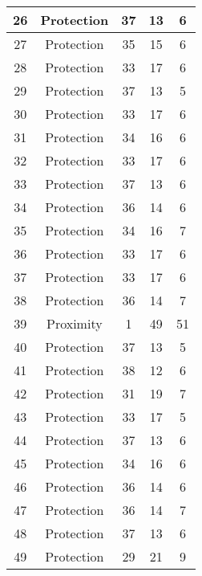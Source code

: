 \documentclass[results.tex]{subfiles}
\begin{document}
\begin{center}
\begin{tabular}{| c || c | c | c | c |}
    \hline
    26 & Protection & 37 & 13 & 6 \\ 
    \hline
    27 & Protection & 35 & 15 & 6 \\ 
    \hline
    28 & Protection & 33 & 17 & 6 \\ 
    \hline
    29 & Protection & 37 & 13 & 5 \\ 
    \hline
    30 & Protection & 33 & 17 & 6 \\ 
    \hline
    31 & Protection & 34 & 16 & 6 \\ 
    \hline
    32 & Protection & 33 & 17 & 6 \\ 
    \hline
    33 & Protection & 37 & 13 & 6 \\ 
    \hline
    34 & Protection & 36 & 14 & 6 \\ 
    \hline
    35 & Protection & 34 & 16 & 7 \\ 
    \hline
    36 & Protection & 33 & 17 & 6 \\ 
    \hline
    37 & Protection & 33 & 17 & 6 \\ 
    \hline
    38 & Protection & 36 & 14 & 7 \\ 
    \hline
    39 & Proximity & 1 & 49 & 51 \\ 
    \hline
    40 & Protection & 37 & 13 & 5 \\ 
    \hline
    41 & Protection & 38 & 12 & 6 \\ 
    \hline
    42 & Protection & 31 & 19 & 7 \\ 
    \hline
    43 & Protection & 33 & 17 & 5 \\ 
    \hline
    44 & Protection & 37 & 13 & 6 \\ 
    \hline
    45 & Protection & 34 & 16 & 6 \\ 
    \hline
    46 & Protection & 36 & 14 & 6 \\ 
    \hline
    47 & Protection & 36 & 14 & 7 \\ 
    \hline
    48 & Protection & 37 & 13 & 6 \\ 
    \hline
    49 & Protection & 29 & 21 & 9 \\ 
    \hline   \end{tabular}
\end{center}
\end{document}
